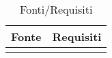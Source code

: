 
\begin{longtable}{X | X}  
			\rowcolor{orange!85}Fonte & Requisiti \\
\endhead
		
\bottomrule
\caption{Fonti/Requisiti}
\end{longtable}   